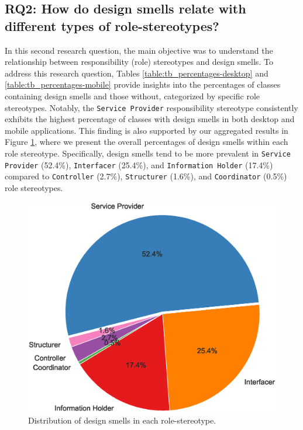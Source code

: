 \documentclass[AMA,Times1COL]{WileyNJDv5} %
\begin{document}
	
	\subsection*{RQ2: How do design smells relate with different types of role-stereotypes?}
	In this second research question, the main objective was to understand the relationship between responsibility (role) stereotypes and design smells. To address this research question, Tables \ref{table:tb_percentages-desktop} and \ref{table:tb_percentages-mobile} provide insights into the percentages of classes containing design smells and those without, categorized by specific role stereotypes. Notably, the {\tt Service Provider} responsibility stereotype consistently exhibits the highest percentage of classes with design smells in both desktop and mobile applications. This finding is also supported by our aggregated results in Figure \ref{fig:pie_chart_percentages}, where we present the overall percentages of design smells within each role stereotype. Specifically, design smells tend to be more prevalent in {\tt Service Provider} (52.4\%), {\tt Interfacer} (25.4\%), and {\tt Information Holder} (17.4\%) compared to {\tt Controller} (2.7\%), {\tt Structurer} (1.6\%), and {\tt Coordinator} (0.5\%) role stereotypes.
	
	\begin{figure}[!h]
		\centering
		\includegraphics[scale=0.4]{figures/piechart_plot.eps}
		\caption{Distribution of design smells in each role-stereotype.}
		\label{fig:pie_chart_percentages}
	\end{figure}
\end{document}
